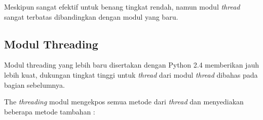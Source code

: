 \vspace{12pt}
\hspace*{0.5in} Meskipun sangat efektif untuk benang tingkat rendah, namun modul \textit{thread} sangat terbatas dibandingkan dengan modul yang baru. \par

\vspace{12pt}
\subsection {Modul Threading} \par
\hspace*{0.5in} Modul threading yang lebih baru disertakan dengan Python 2.4 memberikan jauh lebih kuat, dukungan tingkat tinggi untuk \textit{thread}\textit{ }dari modul\textit{ }\textit{thread}\textit{ }dibahas pada bagian sebelumnya. \par
\hspace*{0.5in} The \textit{thread}\textit{ing }modul mengekpos semua metode dari \textit{thread}\textit{ }dan menyediakan beberapa metode tambahan : \par

